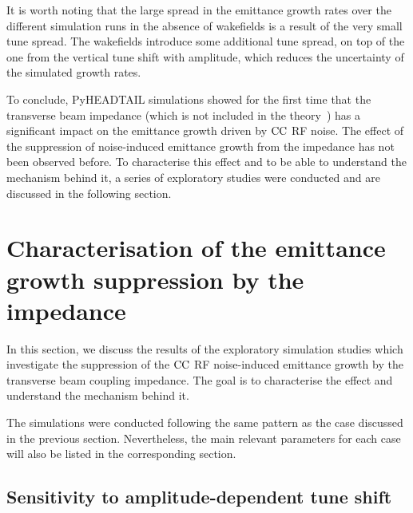 It is worth noting that the large spread in the emittance growth rates over the different simulation runs in the absence of wakefields is a result of the very small tune spread. The wakefields introduce some additional tune spread, on top of the one from the vertical tune shift with amplitude, which reduces the uncertainty of the simulated growth rates.

To conclude, PyHEADTAIL simulations showed for the first time that the transverse beam impedance (which is not included in the theory~\cite{PhysRevSTAB.18.101001}) has a significant impact on the emittance growth driven by ${\mathrm{CC}}$ RF noise. The effect of the suppression of noise-induced emittance growth from the impedance has not been observed before. 
To characterise this effect and to be able to understand the mechanism behind it, a series of exploratory studies were conducted and are discussed in the following section. 


\section{Characterisation of the emittance growth suppression by the impedance}\label{sec:emittance_growth_exploratory_studies}

In this section, we discuss the results of the exploratory simulation studies which investigate the suppression of the ${\mathrm{CC}}$ RF noise-induced emittance growth by the transverse beam coupling impedance. The goal is to characterise the effect and understand the mechanism behind it. 

The simulations were conducted following the same pattern as the case discussed in the previous section. Nevertheless, the main relevant parameters for each case will also be listed in the corresponding section.

\subsection{Sensitivity to amplitude-dependent tune shift}\label{subsec:amplitude_detuning_scan}

